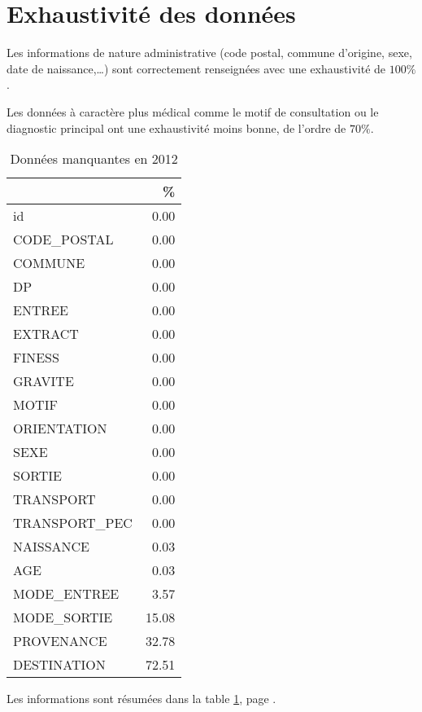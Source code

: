 \documentclass[12pt,english,french]{report}
\begin{document}
\section{Exhaustivité des données}

Les informations de nature administrative (code postal, commune d'origine, sexe, date de naissance,\dots ) sont correctement renseignées avec une exhaustivité de $100\%$.

Les données à caractère plus médical comme le motif de consultation ou le diagnostic principal ont une exhaustivité moins bonne, de l'ordre de $70\%$.

\begin{table}[ht]
\begin{center}
\begin{tabular}{|l|r|}
  \hline
 & \% \\ 
  \hline
id & 0.00 \\ 
  CODE\_POSTAL & 0.00 \\ 
  COMMUNE & 0.00 \\ 
  DP & 0.00 \\ 
  ENTREE & 0.00 \\ 
  EXTRACT & 0.00 \\ 
  FINESS & 0.00 \\ 
  GRAVITE & 0.00 \\ 
  MOTIF & 0.00 \\ 
  ORIENTATION & 0.00 \\ 
  SEXE & 0.00 \\ 
  SORTIE & 0.00 \\ 
  TRANSPORT & 0.00 \\ 
  TRANSPORT\_PEC & 0.00 \\ 
  NAISSANCE & 0.03 \\ 
  AGE & 0.03 \\ 
  MODE\_ENTREE & 3.57 \\ 
  MODE\_SORTIE & 15.08 \\ 
  PROVENANCE & 32.78 \\ 
  DESTINATION & 72.51 \\ 
   \hline
\end{tabular}
\caption{Données manquantes en 2012}
\label{tab2}
\end{center}
\end{table}

Les informations sont résumées dans la table \ref{tab2}, page \pageref{tab2}.
\end{document}
